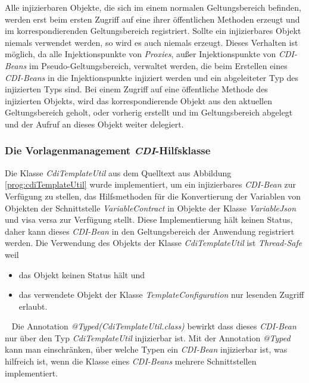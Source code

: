 \newline
\newline
Alle injizierbaren Objekte, die sich im einem normalen Geltungsbereich befinden,  werden erst beim ersten Zugriff auf eine ihrer öffentlichen Methoden erzeugt und im korrespondierenden Geltungsbereich registriert. Sollte ein injizierbares Objekt niemals verwendet werden, so wird es auch niemals erzeugt. Dieses Verhalten ist möglich, da alle Injektionspunkte von \emph{Proxies}, außer Injektionspunkte von \emph{CDI-Beans} im Pseudo-Geltungsbereich, verwaltet werden, die beim Erstellen eines \emph{CDI-Beans} in die Injektionspunkte injiziert werden und ein abgeleiteter Typ des injizierten Typs sind. Bei einem Zugriff auf eine öffentliche Methode des injizierten Objekts, wird das korrespondierende Objekt aus den aktuellen Geltungsbereich geholt, oder vorherig erstellt und im Geltungsbereich abgelegt und der Aufruf an dieses Objekt weiter delegiert.  

\subsubsection{Die Vorlagenmanagement \emph{CDI}-Hilfsklasse}
Die Klasse \emph{CdiTemplateUtil} aus dem Quelltext aus Abbildung \ref{prog:cdiTemplateUtil} wurde implementiert, um ein injizierbares \emph{CDI-Bean} zur Verfügung zu stellen, das Hilfsmethoden für die Konvertierung der Variablen von Objekten der Schnittstelle \emph{VariableContract} in Objekte der Klasse \emph{VariableJson} und visa versa zur Verfügung stellt. Diese Implementierung hält keinen Status, daher kann dieses \emph{CDI-Bean} in den Geltungsbereich der Anwendung registriert werden. Die Verwendung des Objekts der Klasse \emph{CdiTemplateUtil} ist \emph{Thread-Safe} weil
\begin{itemize}
	\item das Objekt keinen Status hält und
	\item das verwendete Objekt der Klasse \emph{TemplateConfiguration} nur lesenden Zugriff erlaubt.
\end{itemize}
\ \newline
Die Annotation \emph{@Typed(CdiTemplateUtil.class)} bewirkt dass dieses \emph{CDI-Bean} nur über den Typ \emph{CdiTemplateUtil} injizierbar ist. Mit der Annotation \emph{@Typed} kann man einschränken, über welche Typen ein \emph{CDI-Bean} injizierbar ist, was hilfreich ist, wenn die Klasse eines \emph{CDI-Beans} mehrere Schnittstellen implementiert.

